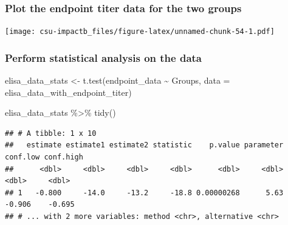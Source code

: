\documentclass[
]{book}
\newenvironment{Shaded}{\begin{snugshade}}{\end{snugshade}}
\newcommand{\AttributeTok}[1]{\textcolor[rgb]{0.77,0.63,0.00}{#1}}
\newcommand{\DecValTok}[1]{\textcolor[rgb]{0.00,0.00,0.81}{#1}}
\newcommand{\FunctionTok}[1]{\textcolor[rgb]{0.00,0.00,0.00}{#1}}
\newcommand{\NormalTok}[1]{#1}
\newcommand{\OtherTok}[1]{\textcolor[rgb]{0.56,0.35,0.01}{#1}}
\newcommand{\SpecialCharTok}[1]{\textcolor[rgb]{0.00,0.00,0.00}{#1}}
\begin{document}
\hypertarget{plot-the-endpoint-titer-data-for-the-two-groups}{%
\subsubsection{Plot the endpoint titer data for the two groups}\label{plot-the-endpoint-titer-data-for-the-two-groups}}

\begin{Shaded}
\end{Shaded}

\texttt{[image: csu-impactb\_files/figure-latex/unnamed-chunk-54-1.pdf]}

\hypertarget{perform-statistical-analysis-on-the-data}{%
\subsubsection{Perform statistical analysis on the data}\label{perform-statistical-analysis-on-the-data}}

\begin{Shaded}
\begin{Highlighting}[]
\NormalTok{elisa\_data\_stats }\OtherTok{\textless{}{-}} \FunctionTok{t.test}\NormalTok{(endpoint\_data }\SpecialCharTok{\textasciitilde{}}\NormalTok{ Groups, }
                           \AttributeTok{data =}\NormalTok{ elisa\_data\_with\_endpoint\_titer)}

\NormalTok{elisa\_data\_stats }\SpecialCharTok{\%\textgreater{}\%}
  \FunctionTok{tidy}\NormalTok{()}
\end{Highlighting}
\end{Shaded}

\begin{verbatim}
## # A tibble: 1 x 10
##   estimate estimate1 estimate2 statistic    p.value parameter conf.low conf.high
##      <dbl>     <dbl>     <dbl>     <dbl>      <dbl>     <dbl>    <dbl>     <dbl>
## 1   -0.800     -14.0     -13.2     -18.8 0.00000268      5.63   -0.906    -0.695
## # ... with 2 more variables: method <chr>, alternative <chr>
\end{verbatim}
\end{document}
